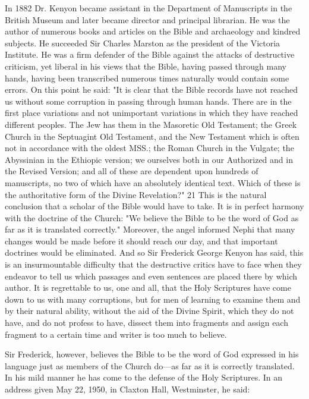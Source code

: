 In 1882 Dr. Kenyon became assistant in the Department of Manuscripts in the British
Museum and later became director and principal librarian. He was the author of numerous
books and articles on the Bible and archaeology and kindred subjects. He succeeded Sir
Charles Marston as the president of the Victoria Institute. He was a firm defender of the
Bible against the attacks of destructive criticism, yet liberal in his views that the Bible,
having passed through many hands, having been transcribed numerous times naturally would
contain some errors. On this point he said: "It is clear that the Bible records have not reached
us without some corruption in passing through human hands. There are in the first place
variations and not unimportant variations in which they have reached different peoples. The
Jew has them in the Masoretic Old Testament; the Greek Church in the Septuagint Old
Testament, and the New Testament which is often not in accordance with the oldest MSS.;
the Roman Church in the Vulgate; the Abyssinian in the Ethiopic version; we ourselves both
in our Authorized and in the Revised Version; and all of these are dependent upon hundreds
of manuscripts, no two of which have an absolutely identical text. Which of these is the
authoritative form of the Divine Revelation?" 21 This is the natural conclusion that a scholar
of the Bible would have to take. It is in perfect harmony with the doctrine of the Church:
"We believe the Bible to be the word of God as far as it is translated correctly." Moreover,
the angel informed Nephi that many changes would be made before it should reach our day,
and that important doctrines would be eliminated. And so Sir Frederick George Kenyon has
said, this is an insurmountable difficulty that the destructive critics have to face when they
endeavor to tell us which passages and even sentences are placed there by which author. It is
regrettable to us, one and all, that the Holy Scriptures have come down to us with many
corruptions, but for men of learning to examine them and by their natural ability, without the
aid of the Divine Spirit, which they do not have, and do not profess to have, dissect them into
fragments and assign each fragment to a certain time and writer is too much to believe.

Sir Frederick, however, believes the Bible to be the word of God expressed in his language
just as members of the Church do—as far as it is correctly translated. In his mild manner he
has come to the defense of the Holy Scriptures. In an address given May 22, 1950, in Claxton
Hall, Westminster, he said:

